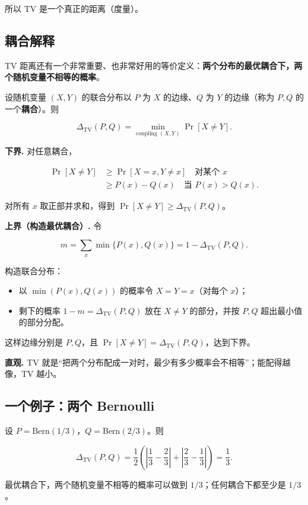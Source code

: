 所以 TV 是一个真正的距离（度量）。

\subsection{耦合解释}


TV 距离还有一个非常重要、也非常好用的等价定义：\textbf{两个分布的最优耦合下，两个随机变量不相等的概率}。

设随机变量 $(X,Y)$ 的联合分布以 $P$ 为 $X$ 的边缘、$Q$ 为 $Y$ 的边缘（称为 $P,Q$ 的一个\textbf{耦合}）。则

\[
\boxed{
\Delta_{\mathrm{TV}}(P,Q)
=\min_{\text{coupling }(X,Y)}\Pr[X\ne Y]
}.
\]

\textbf{下界.} 对任意耦合，

\[
\begin{aligned}
\Pr[X\ne Y]
&\ge\Pr[X=x,Y\ne x]\quad\text{对某个 }x\\
&\ge P(x)-Q(x)\quad\text{当 }P(x)>Q(x).
\end{aligned}
\]

对所有 $x$ 取正部并求和，得到 $\Pr[X\ne Y]\ge\Delta_{\mathrm{TV}}(P,Q)$。

\textbf{上界（构造最优耦合）.} 令

\[
m=\sum_x\min\{P(x),Q(x)\}=1-\Delta_{\mathrm{TV}}(P,Q).
\]

构造联合分布：

\begin{itemize}
\item 以 $\min(P(x),Q(x))$ 的概率令 $X=Y=x$（对每个 $x$）；
\item 剩下的概率 $1-m=\Delta_{\mathrm{TV}}(P,Q)$ 放在 $X\ne Y$ 的部分，并按 $P,Q$ 超出最小值的部分分配。
\end{itemize}


这样边缘分别是 $P,Q$，且 $\Pr[X\ne Y]=\Delta_{\mathrm{TV}}(P,Q)$，达到下界。

\textbf{直观.} TV 就是“把两个分布配成一对时，最少有多少概率会不相等”；能配得越像，TV 越小。

\subsection{一个例子：两个 Bernoulli}


设 $P=\mathrm{Bern}(1/3)$，$Q=\mathrm{Bern}(2/3)$。则

\[
\Delta_{\mathrm{TV}}(P,Q)
=\frac12\left(\left|\frac13-\frac23\right|
+\left|\frac23-\frac13\right|\right)
=\frac13.
\]

最优耦合下，两个随机变量不相等的概率可以做到 $1/3$；任何耦合下都至少是 $1/3$。

